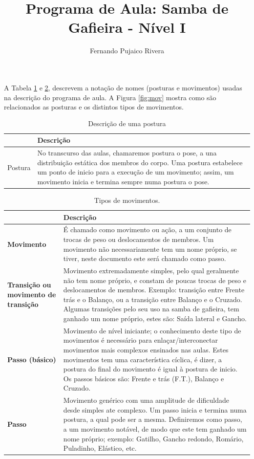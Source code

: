 \documentclass[12pt, a4paper]{article}
\title{Programa de Aula: Samba de Gafieira - Nível I}
\author{Fernando Pujaico Rivera}
\date{}
\begin{document}
{\let\newpage\relax\maketitle}
A Tabela \ref{tab:typospos} e \ref {tab:typosmov}, descrevem a notação de nomes  (posturas e movimentos) usadas 
na descrição do programa de aula.
A Figura \ref{fig:mov} mostra como são relacionados as posturas e os distintos tipos de movimentos.


\begin{table}[h]
\centering
\begin{tabular}{|p{3cm}|p{13cm}|}
\hline
~ & Descrição \\  \hline
Postura & No transcurso das aulas, chamaremos postura o pose, a una distribuição estática
dos membros do corpo. Uma postura estabelece um ponto de inicio para a execução de um
movimento; assim, um movimento inicia e termina sempre numa postura o pose.\\ \hline

\end{tabular}
\caption{Descrição de uma postura}
\label{tab:typospos}
\end{table}


\begin{table}[h]
\centering
\begin{tabular}{|p{2.5cm}|p{13.5cm}|}
\hline
~ & Descrição \\  \hline
\textbf{Movimento} & É chamado como movimento ou ação, a um conjunto de trocas de peso ou deslocamentos de membros.
Um movimento não necessariamente tem um nome próprio, se tiver, neste documento este será
chamado como passo.\\ \hline
\textbf{Transição ou movimento de transição} &  Movimento extremadamente simples, pelo qual geralmente não tem nome próprio,
e constam de poucas trocas de peso e deslocamentos de membros. Exemplo: transição entre Frente trás e o Balanço, 
ou a transição entre Balanço e o Cruzado. Algumas transições
pelo seu uso na samba de gafieira, tem ganhado um nome próprio, estes são: Saída lateral e Gancho.\\ \hline
\textbf{Passo (básico)} & Movimento de nível iniciante; o conhecimento deste tipo de
movimentos é necessário para enlaçar/interconectar movimentos mais complexos ensinados nas aulas. Estes
movimentos tem uma característica cíclica, é dizer, a postura do final do movimento 
é igual à postura de inicio. Os passos básicos são: Frente e trás (F.T.), Balanço e Cruzado.\\ \hline
\textbf{Passo} &  Movimento genérico com uma amplitude de dificuldade desde simples ate complexo.
Um passo inicia e termina numa postura, a qual pode ser a mesma. Definiremos como passo, a um movimento
notável, de modo que este tem ganhado um nome próprio; exemplo: Gatilho, Gancho redondo, Romário, Puladinho, Elástico, etc. \\ \hline
\end{tabular}
\caption{Tipos de movimentos.}
\label{tab:typosmov}
\end{table}
\end{document}
